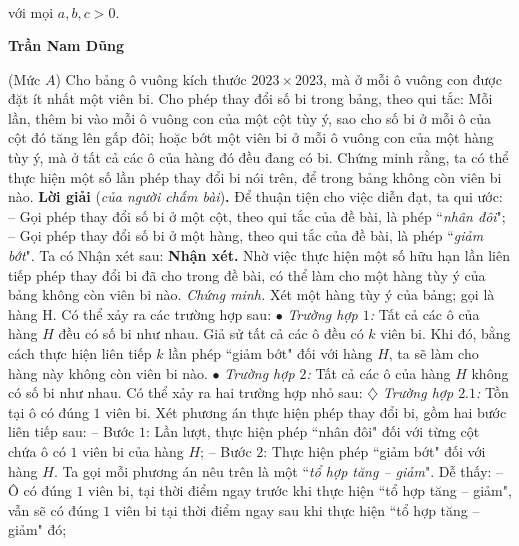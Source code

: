 \begin{multicols}{2}
{\begin{align*}
	\end{align*}
	với mọi $a, b, c > 0$.
	\begin{flushright}
		\textbf{Trần Nam Dũng}
	\end{flushright}
	{}
	(Mức $A$) Cho bảng ô vuông kích thước $2023 \times 2023$, mà ở mỗi ô vuông con được đặt ít nhất một viên bi. Cho phép thay đổi số bi trong bảng, theo qui tắc: Mỗi lần, thêm bi vào mỗi ô vuông con của một cột tùy ý, sao cho số bi ở mỗi ô của cột đó tăng lên gấp đôi; hoặc bớt một viên bi ở mỗi ô vuông con của một hàng tùy ý, mà ở tất cả các ô của hàng đó đều đang có bi. Chứng minh rằng, ta có thể thực hiện một số lần phép thay đổi bi nói trên, để trong bảng không còn viên bi nào.
	\vskip 0.05cm
	\textbf{Lời giải} (\textit{của người chấm bài})\textbf{.}
	\vskip 0.05cm
	Để thuận tiện cho việc diễn đạt, ta qui ước:
	\vskip 0.05cm
	-- Gọi phép thay đổi số bi ở một cột, theo qui tắc của đề bài, là phép ``\textit{nhân đôi}";
	\vskip 0.05cm
	-- Gọi phép thay đổi số bi ở một hàng, theo qui tắc của đề bài, là phép ``\textit{giảm bớt}".
	\vskip 0.05cm
	Ta có Nhận xét sau:
	\vskip 0.05cm
	\textbf{Nhận xét.} Nhờ việc thực hiện một số hữu hạn lần liên tiếp phép thay đổi bi đã cho trong đề bài, có thể làm cho một hàng tùy ý của bảng không còn viên bi nào.
	\vskip 0.05cm
	\textit{Chứng minh.}
	\vskip 0.05cm
	Xét một hàng tùy ý của bảng; gọi là hàng H. Có thể xảy ra các trường hợp sau:
	\vskip 0.05cm
	$\bullet$ \textit{Trường hợp $1$:} Tất cả các ô của hàng $H$ đều có số bi như nhau.
	\vskip 0.05cm
	Giả sử tất cả các ô đều có $k$ viên bi.
	\vskip 0.05cm
	Khi đó, bằng cách thực hiện liên tiếp $k$ lần phép ``giảm bớt" đối với hàng $H$, ta sẽ làm cho hàng này không còn viên bi nào.
	\vskip 0.05cm
	$\bullet$ \textit{Trường hợp $2$:} Tất cả các ô của hàng $H$ không có số bi như nhau.
	\vskip 0.05cm
	Có thể xảy ra hai trường hợp nhỏ sau:
	\vskip 0.05cm
	$\diamondsuit$\textit{ Trường hợp $2.1$:} Tồn tại ô có đúng $1$ viên bi.
	\vskip 0.05cm
	Xét phương án thực hiện phép thay đổi bi, gồm hai bước liên tiếp sau:
	\vskip 0.05cm
	-- Bước $1$: Lần lượt, thực hiện phép ``nhân đôi" đối với từng cột chứa ô có $1$ viên bi của hàng $H$;
	\vskip 0.05cm
	-- Bước $2$: Thực hiện phép ``giảm bớt" đối với hàng $H$.
	\vskip 0.05cm
	Ta gọi mỗi phương án nêu trên là một ``\textit{tổ hợp tăng -- giảm}".
	\vskip 0.05cm
	Dễ thấy:
	\vskip 0.05cm
	-- Ô có đúng $1$ viên bi, tại thời điểm ngay trước khi thực hiện ``tổ hợp tăng -- giảm", vẫn sẽ có đúng $1$ viên bi tại thời điểm ngay sau khi thực hiện ``tổ hợp tăng -- giảm" đó;
	\vskip 0.05cm
}
\end{multicols}
